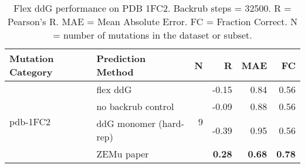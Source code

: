 \begin{table}
  \begin{tabular}{llrrrr}
\toprule
Mutation Category &       Prediction Method &  N &     R &  MAE &   FC \\
\midrule
 \multirow{ 4}{*}{pdb-1FC2} & flex ddG & \multirow{ 4}{*}{9} & -0.15 & 0.84 & 0.56  \\
 & no backrub control & & -0.09 & 0.88 & 0.56  \\
 & ddG monomer (hard-rep) & & -0.39 & 0.95 & 0.56  \\
 & ZEMu paper & & \textbf{0.28} & \textbf{0.68} & \textbf{0.78}  \\
\bottomrule
\end{tabular}
  \caption[Flex ddG performance on PDB 1FC2]{
    Flex ddG performance on PDB 1FC2. Backrub steps = 32500. R = Pearson's R. MAE = Mean Absolute Error. FC = Fraction Correct. N = number of mutations in the dataset or subset.
  } \label{tab:table-pdb-1FC2}
\end{table}
